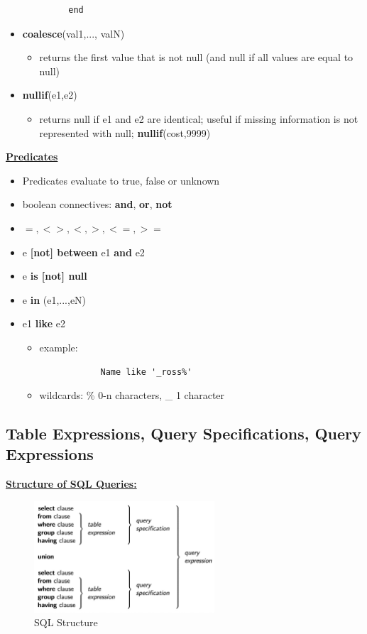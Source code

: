 \begin{itemize}
\begin{lstlisting}
         end
     \end{lstlisting}
     \item \textbf{coalesce}(val1,..., valN)
     \begin{itemize}
         \item returns the first value that is not null (and null if all values are equal to null)
     \end{itemize}
     \item  \textbf{nullif}(e1,e2)
     \begin{itemize}
         \item returns null if e1 and e2 are identical; useful if missing information is not represented with null; \textbf{nullif}(cost,9999)
     \end{itemize}
\end{itemize}

\textbf{\underline{Predicates}}
\bigskip

\begin{itemize}
    \item Predicates evaluate to true, false or unknown
    \item boolean connectives: \textbf{and}, \textbf{or}, \textbf{not}
    \item $=,<>, <,>,<=,>=$
    \item e \textbf{[not] between} e1 \textbf{and} e2
    \item e \textbf{is [not] null}
    \item e \textbf{in} (e1,...,eN)
    \item e1 \textbf{like} e2
    \begin{itemize}
        \item example:
        \begin{lstlisting}
            Name like '_ross%'
        \end{lstlisting}
        \item wildcards: \% 0-n characters, \_ 1 character
    \end{itemize}
\end{itemize}



\subsection{Table Expressions, Query Specifications, Query Expressions}
\textbf{\underline{Structure of SQL Queries:}}
\bigskip

\begin{figure}[H]
\centering
\includegraphics[width=0.6\textwidth]{images/Screenshot 2024-05-04 at 16.56.14.jpg}
\caption{SQL Structure}
\end{figure}

